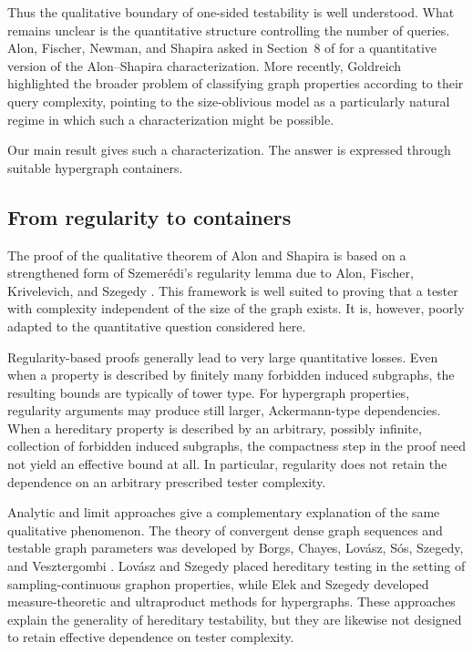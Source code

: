 \documentclass[11pt,reqno,letterpaper]{amsart}
\theoremstyle{plain}
\theoremstyle{remark}
\begin{document}
Thus the qualitative boundary of one-sided testability is well understood. What remains unclear is the quantitative structure controlling the number of queries. Alon, Fischer, Newman, and Shapira asked in Section~8 of \cite{alon2008characterization} for a quantitative version of the Alon--Shapira characterization. More recently, Goldreich \cite{goldreich2021open} highlighted the broader problem of classifying graph properties according to their query complexity, pointing to the size-oblivious model as a particularly natural regime in which such a characterization might be possible.

Our main result gives such a characterization. The answer is expressed through suitable hypergraph containers.

\subsection{From regularity to containers}

The proof of the qualitative theorem of Alon and Shapira is based on a strengthened form of Szemerédi's regularity lemma due to Alon, Fischer, Krivelevich, and Szegedy \cite{alon2000efficient}. This framework is well suited to proving that a tester with complexity independent of the size of the graph exists. It is, however, poorly adapted to the quantitative question considered here.

Regularity-based proofs generally lead to very large quantitative losses. Even when a property is described by finitely many forbidden induced subgraphs, the resulting bounds are typically of tower type. For hypergraph properties, regularity arguments may produce still larger, Ackermann-type dependencies. When a hereditary property is described by an arbitrary, possibly infinite, collection of forbidden induced subgraphs, the compactness step in the proof need not yield an effective bound at all. In particular, regularity does not retain the dependence on an arbitrary prescribed tester complexity.

Analytic and limit approaches give a complementary explanation of the same qualitative phenomenon. The theory of convergent dense graph sequences and testable graph parameters was developed by Borgs, Chayes, Lovász, Sós, Szegedy, and Vesztergombi \cite{BorgsChayesLovaszSosSzegedyVesztergombi}. Lovász and Szegedy \cite{LovaszSzegedy} placed hereditary testing in the setting of sampling-continuous graphon properties, while Elek and Szegedy \cite{ElekSzegedy} developed measure-theoretic and ultraproduct methods for hypergraphs. These approaches explain the generality of hereditary testability, but they are likewise not designed to retain effective dependence on tester complexity.
\end{document}
